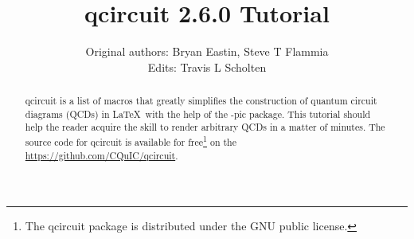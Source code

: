 \documentclass[twocolumn,nofootinbib]{revtex4}
\begin{document}
\lstset{language=TeX}

\title{qcircuit 2.6.0 Tutorial}

\author{Original authors: Bryan Eastin, Steve T Flammia\\ Edits: Travis L Scholten}
	
\begin{abstract}qcircuit is a list of macros that greatly simplifies the construction of 
quantum circuit diagrams (QCDs) in \LaTeX \ with the help of the \Xy-pic 
package.  This tutorial should help the reader acquire 
the skill to render arbitrary QCDs in a matter of minutes. The source code for qcircuit is available for free\footnote{The qcircuit package is distributed under the GNU public license.} on the \href{CQuIC GitHub page}{https://github.com/CQuIC/qcircuit}.
\end{abstract}

\maketitle
\end{document}
